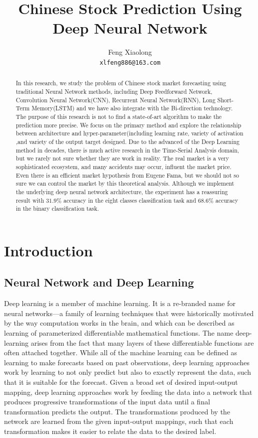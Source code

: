\documentclass{article}
\title{Chinese Stock Prediction Using Deep Neural Network}
\author{Feng Xiaolong  \\
	\texttt{xlfeng886@163.com} \\
}
\begin{document}
\maketitle




\begin{abstract}
	In this research, we study the problem of Chinese stock market forecasting using traditional Neural Network methods, including Deep Feedforward Network, Convolution Neural Network(CNN), Recurrent Neural Network(RNN), Long Short-Term Memory(LSTM) and we have also integrate with the Bi-direction technology. The purpose of this research is not to find a state-of-art algorithm to make the prediction more precise. We focus on the primary method and explore the relationship between architecture and hyper-parameter(including learning rate, variety of activation ,and variety of the output target designed. Due to the advanced of the Deep Learning method in decades, there is much active research in the Time-Serial Analysis domain, but we rarely not sure whether they are work in reality. The real market is a very sophisticated ecosystem, and many accidents may occur, influent the market price. Even there is an efficient market hypothesis from Eugene Fama, but we should not so sure we can control the market by this theoretical analysis. Although we implement the underlying deep neural network architecture, the experiment has a reassuring result with $31.9\%$ accuracy in the eight classes classification task and $68.6\%$ accuracy in the binary classification task.
\end{abstract}
%
\section{Introduction}
\label{sec:introduction}
\subsection{Neural Network and Deep Learning}
Deep learning is a member of machine learning. It is a re-branded name for neural networks—a family of learning techniques that were historically motivated by the way computation works in the brain, and which can be described as learning of parameterized differentiable mathematical functions. The name deep-learning arises from the fact that many layers of these differentiable functions are often attached together. While all of the machine learning can be defined as learning to make forecasts based on past observations, deep learning approaches work by learning to not only predict but also to exactly represent the data, such that it is suitable for the forecast. Given a broad set of desired input-output mapping, deep learning approaches work by feeding the data into a network that produces progressive transformations of the input data until a final transformation predicts the output. The transformations produced by the network are learned from the given input-output mappings, such that each transformation makes it easier to relate the data to the desired label.
\end{document}
